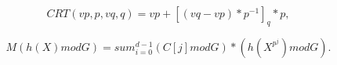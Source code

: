\documentclass{article}
\begin{document}
\[ CRT(vp,p,vq,q) = vp + [(vq-vp) * p^{-1}]_q * p, \]
\pagebreak

\[ M(h(X) mod G) = sum_{i=0}^{d-1} (C[j] mod G) * (h(X^{p^j}) mod G).\]
\pagebreak
\end{document}
